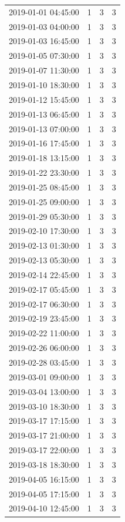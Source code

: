 \begin{tabular}{lrrr}
2019-01-01 04:45:00 & 1 & 3 & 3 \\
2019-01-03 04:00:00 & 1 & 3 & 3 \\
2019-01-03 16:45:00 & 1 & 3 & 3 \\
2019-01-05 07:30:00 & 1 & 3 & 3 \\
2019-01-07 11:30:00 & 1 & 3 & 3 \\
2019-01-10 18:30:00 & 1 & 3 & 3 \\
2019-01-12 15:45:00 & 1 & 3 & 3 \\
2019-01-13 06:45:00 & 1 & 3 & 3 \\
2019-01-13 07:00:00 & 1 & 3 & 3 \\
2019-01-16 17:45:00 & 1 & 3 & 3 \\
2019-01-18 13:15:00 & 1 & 3 & 3 \\
2019-01-22 23:30:00 & 1 & 3 & 3 \\
2019-01-25 08:45:00 & 1 & 3 & 3 \\
2019-01-25 09:00:00 & 1 & 3 & 3 \\
2019-01-29 05:30:00 & 1 & 3 & 3 \\
2019-02-10 17:30:00 & 1 & 3 & 3 \\
2019-02-13 01:30:00 & 1 & 3 & 3 \\
2019-02-13 05:30:00 & 1 & 3 & 3 \\
2019-02-14 22:45:00 & 1 & 3 & 3 \\
2019-02-17 05:45:00 & 1 & 3 & 3 \\
2019-02-17 06:30:00 & 1 & 3 & 3 \\
2019-02-19 23:45:00 & 1 & 3 & 3 \\
2019-02-22 11:00:00 & 1 & 3 & 3 \\
2019-02-26 06:00:00 & 1 & 3 & 3 \\
2019-02-28 03:45:00 & 1 & 3 & 3 \\
2019-03-01 09:00:00 & 1 & 3 & 3 \\
2019-03-04 13:00:00 & 1 & 3 & 3 \\
2019-03-10 18:30:00 & 1 & 3 & 3 \\
2019-03-17 17:15:00 & 1 & 3 & 3 \\
2019-03-17 21:00:00 & 1 & 3 & 3 \\
2019-03-17 22:00:00 & 1 & 3 & 3 \\
2019-03-18 18:30:00 & 1 & 3 & 3 \\
2019-04-05 16:15:00 & 1 & 3 & 3 \\
2019-04-05 17:15:00 & 1 & 3 & 3 \\
2019-04-10 12:45:00 & 1 & 3 & 3 \\

\end{tabular}
